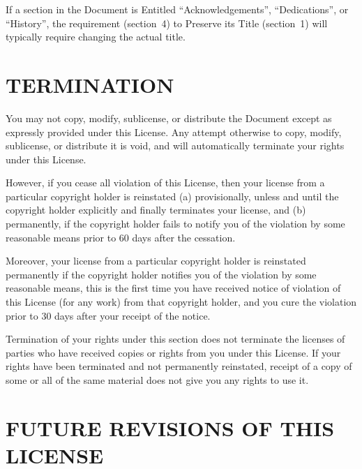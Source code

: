 \documentclass[a4paper,12pt]{book}
\theoremstyle{mes_exemples}	\newtheorem{exemple}[numtho]{Exemple}
\theoremstyle{mes_tho}
\begin{document}
If a section in the Document is Entitled ``Acknowledgements'',
``Dedications'', or ``History'', the requirement (section~4) to Preserve
its Title (section~1) will typically require changing the actual
title.

\section{TERMINATION}

You may not copy, modify, sublicense, or distribute the Document
except as expressly provided under this License.  Any attempt
otherwise to copy, modify, sublicense, or distribute it is void, and
will automatically terminate your rights under this License.

However, if you cease all violation of this License, then your license
from a particular copyright holder is reinstated (a) provisionally,
unless and until the copyright holder explicitly and finally
terminates your license, and (b) permanently, if the copyright holder
fails to notify you of the violation by some reasonable means prior to
60 days after the cessation.

Moreover, your license from a particular copyright holder is
reinstated permanently if the copyright holder notifies you of the
violation by some reasonable means, this is the first time you have
received notice of violation of this License (for any work) from that
copyright holder, and you cure the violation prior to 30 days after
your receipt of the notice.

Termination of your rights under this section does not terminate the
licenses of parties who have received copies or rights from you under
this License.  If your rights have been terminated and not permanently
reinstated, receipt of a copy of some or all of the same material does
not give you any rights to use it.


\section{FUTURE REVISIONS OF THIS LICENSE}
\end{document}
